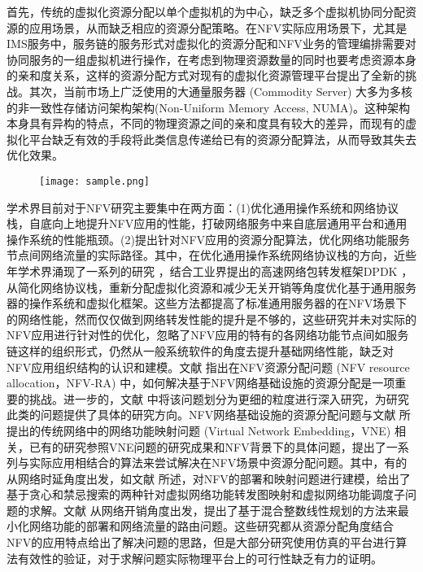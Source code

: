 首先，传统的虚拟化资源分配以单个虚拟机的为中心，缺乏多个虚拟机协同分配资源的应用场景，从而缺乏相应的资源分配策略。在NFV实际应用场景下，尤其是IMS服务中，服务链的服务形式对虚拟化的资源分配和NFV业务的管理编排需要对协同服务的一组虚拟机进行操作，在考虑到物理资源数量的同时也要考虑资源本身的亲和度关系，这样的资源分配方式对现有的虚拟化资源管理平台提出了全新的挑战。其次，当前市场上广泛使用的大通量服务器 (Commodity Server) 大多为多核的非一致性存储访问架构架构(Non-Uniform Memory Access, NUMA)。这种架构本身具有异构的特点，不同的物理资源之间的亲和度具有较大的差异，而现有的虚拟化平台缺乏有效的手段将此类信息传递给已有的资源分配算法\cite{}，从而导致其失去优化效果。
\begin{figure}[!htp]
	\centering
	\texttt{[image: sample.png]}
\end{figure}
		
学术界目前对于NFV研究主要集中在两方面：(1)优化通用操作系统和网络协议栈，自底向上地提升NFV应用的性能，打破网络服务中来自底层通用平台和通用操作系统的性能瓶颈。(2)提出针对NFV应用的资源分配算法，优化网络功能服务节点间网络流量的实际路径。其中，在优化通用操作系统网络协议栈的方向，近些年学术界涌现了一系列的研究 \cite{rizzo2012netmap,ram2013hyper,belay2014ix,hwang2015netvm,yasukata2016stackmap,prekas2017zygos}，结合工业界提出的高速网络包转发框架DPDK \cite{intel2015data} ，从简化网络协议栈，重新分配虚拟化资源和减少无关开销等角度优化基于通用服务器的操作系统和虚拟化框架。这些方法都提高了标准通用服务器的在NFV场景下的网络性能，然而仅仅做到网络转发性能的提升是不够的，这些研究并未对实际的NFV应用进行针对性的优化，忽略了NFV应用的特有的各网络功能节点间如服务链这样的组织形式，仍然从一般系统软件的角度去提升基础网络性能，缺乏对NFV应用组织结构的认识和建模。文献  指出在NFV资源分配问题 (NFV resource allocation，NFV-RA) 中，如何解决基于NFV网络基础设施的资源分配是一项重要的挑战。进一步的，文献  中将该问题划分为更细的粒度进行深入研究，为研究此类的问题提供了具体的研究方向。NFV网络基础设施的资源分配问题与文献  所提出的传统网络中的网络功能映射问题 (Virtual Network Embedding，VNE) 相关，已有的研究参照VNE问题的研究成果和NFV背景下的具体问题，提出了一系列与实际应用相结合的算法来尝试解决在NFV场景中资源分配问题。其中，有的从网络时延角度出发，如文献  所述，对NFV的部署和映射问题进行建模，给出了基于贪心和禁忌搜索的两种针对虚拟网络功能转发图映射和虚拟网络功能调度子问题的求解。文献  从网络开销角度出发，提出了基于混合整数线性规划的方法来最小化网络功能的部署和网络流量的路由问题。这些研究都从资源分配角度结合NFV的应用特点给出了解决问题的思路，但是大部分研究使用仿真的平台进行算法有效性的验证，对于求解问题实际物理平台上的可行性缺乏有力的证明。

